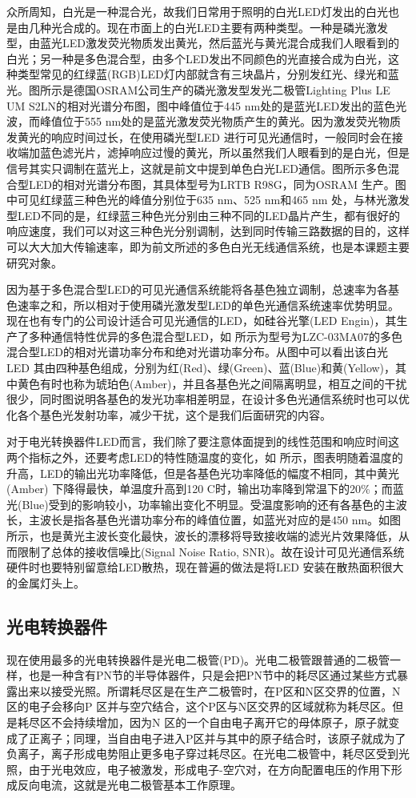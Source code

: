 众所周知，白光是一种混合光，故我们日常用于照明的白光LED灯发出的白光也是由几种光合成的。现在市面上的白光LED主要有两种类型。一种是磷光激发型，由蓝光LED激发荧光物质发出黄光，然后蓝光与黄光混合成我们人眼看到的白光；另一种是多色混合型，由多个LED发出不同颜色的光直接合成为白光，这种类型常见的红绿蓝(RGB)LED灯内部就含有三块晶片，分别发红光、绿光和蓝光。图所示是德国OSRAM公司生产的磷光激发型发光二极管Lighting Plus LE UM S2LN的相对光谱分布图\cite{LE2011}，图中峰值位于445 nm处的是蓝光LED发出的蓝色光波，而峰值位于555 nm处的是蓝光激发荧光物质产生的黄光。因为激发荧光物质发黄光的响应时间过长，在使用磷光型LED 进行可见光通信时，一般同时会在接收端加蓝色滤光片，滤掉响应过慢的黄光，所以虽然我们人眼看到的是白光，但是信号其实只调制在蓝光上，这就是前文中提到单色白光LED通信。图所示多色混合型LED的相对光谱分布图\citep{LRTB2011}，其具体型号为LRTB R98G，同为OSRAM 生产。图中可见红绿蓝三种色光的峰值分别位于635 nm、525 nm和465 nm 处，与林光激发型LED不同的是，红绿蓝三种色光分别由三种不同的LED晶片产生，都有很好的响应速度，我们可以对这三种色光分别调制，达到同时传输三路数据的目的，这样可以大大加大传输速率，即为前文所述的多色白光无线通信系统，也是本课题主要研究对象。


因为基于多色混合型LED的可见光通信系统能将各基色独立调制，总速率为各基色速率之和，所以相对于使用磷光激发型LED的单色光通信系统速率优势明显。现在也有专门的公司设计适合可见光通信的LED，如硅谷光擎(LED Engin)，其生产了多种通信特性优异的多色混合型LED，如 所示为型号为LZC-03MA07的多色混合型LED的相对光谱功率分布和绝对光谱功率分布。从图中可以看出该白光LED 其由四种基色组成，分别为红(Red)、绿(Green)、蓝(Blue)和黄(Yellow)，其中黄色有时也称为琥珀色(Amber)，并且各基色光之间隔离明显，相互之间的干扰很少，同时图说明各基色的发光功率相差明显，在设计多色光通信系统时也可以优化各个基色光发射功率，减少干扰，这个是我们后面研究的内容。

对于电光转换器件LED而言，我们除了要注意体面提到的线性范围和响应时间这两个指标之外，还要考虑LED的特性随温度的变化，如 所示\cite{LZC2013}，图表明随着温度的升高，LED的输出光功率降低，但是各基色光功率降低的幅度不相同，其中黄光(Amber) 下降得最快，单温度升高到120 C时，输出功率降到常温下的20\%；而蓝光(Blue)受到的影响较小，功率输出变化不明显。受温度影响的还有各基色的主波长，主波长是指各基色光谱功率分布的峰值位置，如蓝光对应的是450 nm。如图所示，也是黄光主波长变化最快，波长的漂移将导致接收端的滤光片效果降低，从而限制了总体的接收信噪比(Signal Noise Ratio, SNR)。故在设计可见光通信系统硬件时也要特别留意给LED散热，现在普遍的做法是将LED 安装在散热面积很大的金属灯头上。

\subsection{光电转换器件}
现在使用最多的光电转换器件是光电二极管(PD)。光电二极管跟普通的二极管一样，也是一种含有PN节的半导体器件，只是会把PN节中的耗尽区通过某些方式暴露出来以接受光照。所谓耗尽区是在生产二极管时，在P区和N区交界的位置，N 区的电子会移向P 区并与空穴结合，这个P区与N区交界的区域就称为耗尽区。但是耗尽区不会持续增加，因为N 区的一个自由电子离开它的母体原子，原子就变成了正离子；同理，当自由电子进入P区并与其中的原子结合时，该原子就成为了负离子，离子形成电势阻止更多电子穿过耗尽区。在光电二极管中，耗尽区受到光照，由于光电效应，电子被激发，形成电子-空穴对，在方向配置电压的作用下形成反向电流，这就是光电二极管基本工作原理。

